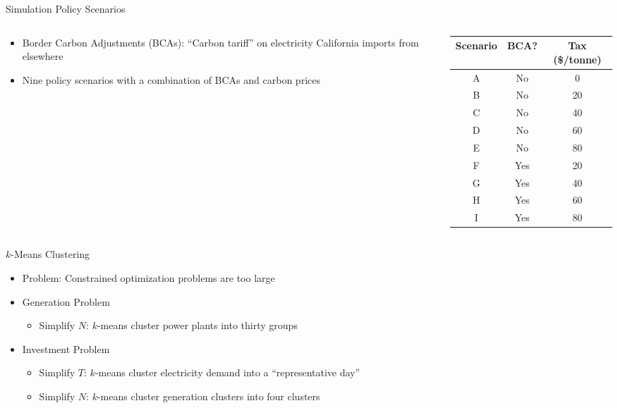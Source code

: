 \documentclass[11pt, aspectratio = 169]{beamer}
\newcommand{\1}{\mathds{1}}
\begin{document}
\begin{frame}{Simulation Policy Scenarios}
    
    \begin{columns}
        \begin{column}{0.5\textwidth}
            \begin{itemize}
                \item Border Carbon Adjustments (BCAs): ``Carbon tariff'' on electricity California imports from elsewhere
                \vspace*{1em}
                \item Nine policy scenarios with a combination of BCAs and carbon prices
            \end{itemize}
        \end{column}
        \begin{column}{0.5\textwidth}
            \footnotesize
            \centering
            \begin{tabular}{c c c}
                \hline\hline
                Scenario & BCA? & Tax (\$/tonne)\\
                \hline
                A & No & 0\\
                B & No & 20\\
                C & No & 40\\
                D & No & 60\\
                E & No & 80\\
                F & Yes & 20 \\
                G & Yes & 40 \\
                H & Yes & 60 \\
                I & Yes & 80 \\
            \hline    
            \end{tabular}
        \end{column}
    \end{columns}

\end{frame}


\begin{frame}{$k$-Means Clustering}
    
\begin{itemize}
    \item Problem: Constrained optimization problems are too large
    \vfill
    \item Generation Problem
    \begin{itemize}
        \item Simplify $N$: $k$-means cluster power plants into thirty groups
    \end{itemize}
    \vfill 
    \item Investment Problem
    \begin{itemize}
        \item Simplify $T$: $k$-means cluster electricity demand into a ``representative day''
        \item Simplify $N$: $k$-means cluster generation clusters into four clusters
    \end{itemize}
\end{itemize}

\end{frame}
\end{document}
